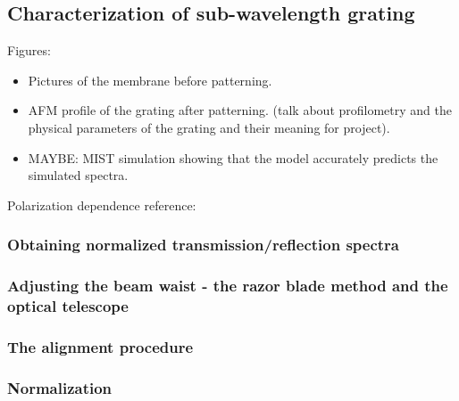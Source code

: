 \subsection{Characterization of sub-wavelength grating}

Figures:
\begin{itemize}
    \item Pictures of the membrane before patterning.
    \item AFM profile of the grating after patterning. (talk about profilometry and the physical parameters of the grating and their meaning for project).
    \item MAYBE: MIST simulation showing that the model accurately predicts the simulated spectra.
\end{itemize}

Polarization dependence reference: \cite{Ko}

\subsubsection{Obtaining normalized transmission/reflection spectra}

\subsubsection{Adjusting the beam waist - the razor blade method and the optical telescope}

\subsubsection{The alignment procedure}

\subsubsection{Normalization}
